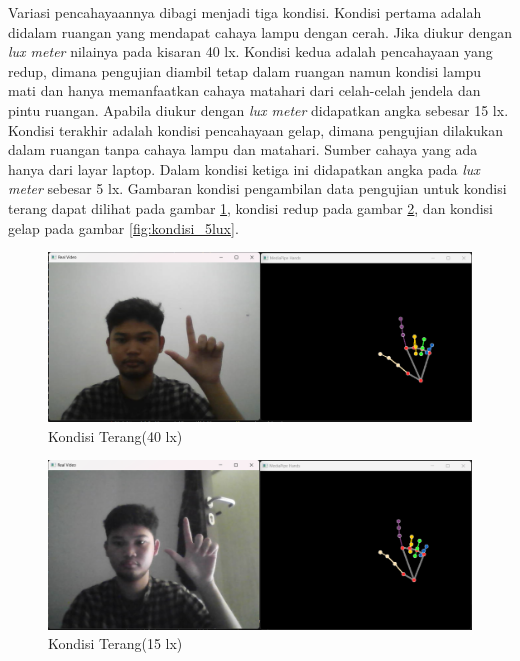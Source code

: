 Variasi pencahayaannya dibagi menjadi tiga kondisi. Kondisi pertama adalah didalam ruangan yang mendapat cahaya lampu dengan cerah. Jika diukur dengan \emph{lux meter} nilainya pada kisaran 40 lx. Kondisi kedua adalah pencahayaan yang redup, dimana pengujian diambil tetap dalam ruangan namun kondisi lampu mati dan hanya memanfaatkan cahaya matahari dari celah-celah jendela dan pintu ruangan. Apabila diukur dengan \emph{lux meter} didapatkan angka sebesar 15 lx. Kondisi terakhir adalah kondisi pencahayaan gelap, dimana pengujian dilakukan dalam ruangan tanpa cahaya lampu dan matahari. Sumber cahaya yang ada hanya dari layar laptop. Dalam kondisi ketiga ini didapatkan angka pada \emph{lux meter} sebesar 5 lx. Gambaran kondisi pengambilan data pengujian untuk kondisi terang dapat dilihat pada gambar \ref{fig:kondisi_40lux}, kondisi redup pada gambar \ref{fig:kondisi_15lux}, dan kondisi gelap pada gambar \ref{fig:kondisi_5lux}.

\begin{figure}[!htb]
  \centering
  \includegraphics[scale=0.4]{gambar/pengujian-cahaya/kondisi_40lux.png}
  \caption{Kondisi Terang(40 lx)}
  \label{fig:kondisi_40lux} 
\end{figure}

\begin{figure}[!htb]
  \centering
  \includegraphics[scale=0.4]{gambar/pengujian-cahaya/kondisi_15lux.png}
  \caption{Kondisi Terang(15 lx)}
  \label{fig:kondisi_15lux} 
\end{figure}

